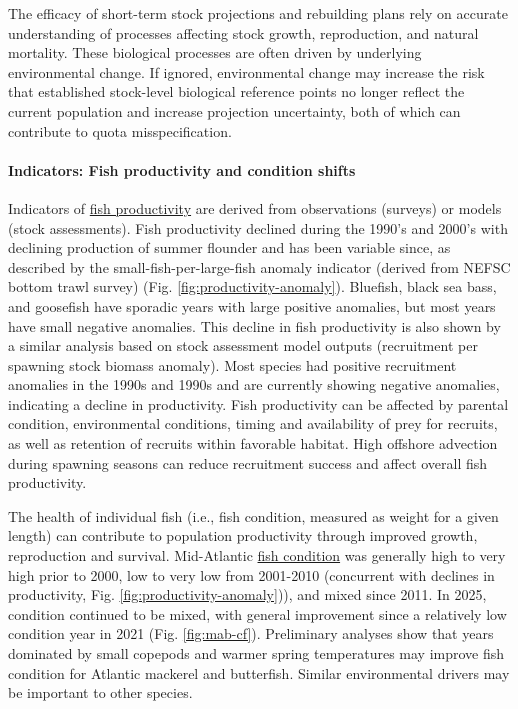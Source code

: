 \documentclass[
  10pt,
]{article}
\begin{document}
The efficacy of short-term stock projections and rebuilding plans rely on accurate understanding of processes affecting stock growth, reproduction, and natural mortality. These biological processes are often driven by underlying environmental change. If ignored, environmental change may increase the risk that established stock-level biological reference points no longer reflect the current population and increase projection uncertainty, both of which can contribute to quota misspecification.

\paragraph{Indicators: Fish productivity and condition shifts}\label{indicators-fish-productivity-and-condition-shifts}

Indicators of \href{https://noaa-edab.github.io/catalog/productivity_anomaly.html}{fish productivity} are derived from observations (surveys) or models (stock assessments). Fish productivity declined during the 1990's and 2000's with declining production of summer flounder and has been variable since, as described by the small-fish-per-large-fish anomaly indicator (derived from NEFSC bottom trawl survey) (Fig. \ref{fig:productivity-anomaly}). Bluefish, black sea bass, and goosefish have sporadic years with large positive anomalies, but most years have small negative anomalies. This decline in fish productivity is also shown by a similar analysis based on stock assessment model outputs (recruitment per spawning stock biomass anomaly). Most species had positive recruitment anomalies in the 1990s and 1990s and are currently showing negative anomalies, indicating a decline in productivity. Fish productivity can be affected by parental condition, environmental conditions, timing and availability of prey for recruits, as well as retention of recruits within favorable habitat. High offshore advection during spawning seasons can reduce recruitment success and affect overall fish productivity.

The health of individual fish (i.e., fish condition, measured as weight for a given length) can contribute to population productivity through improved growth, reproduction and survival. Mid-Atlantic \href{https://noaa-edab.github.io/catalog/condition.html}{fish condition} was generally high to very high prior to 2000, low to very low from 2001-2010 (concurrent with declines in productivity, Fig. \ref{fig:productivity-anomaly})), and mixed since 2011. In 2025, condition continued to be mixed, with general improvement since a relatively low condition year in 2021 (Fig. \ref{fig:mab-cf}). Preliminary analyses show that years dominated by small copepods and warmer spring temperatures may improve fish condition for Atlantic mackerel and butterfish. Similar environmental drivers may be important to other species.
\end{document}
